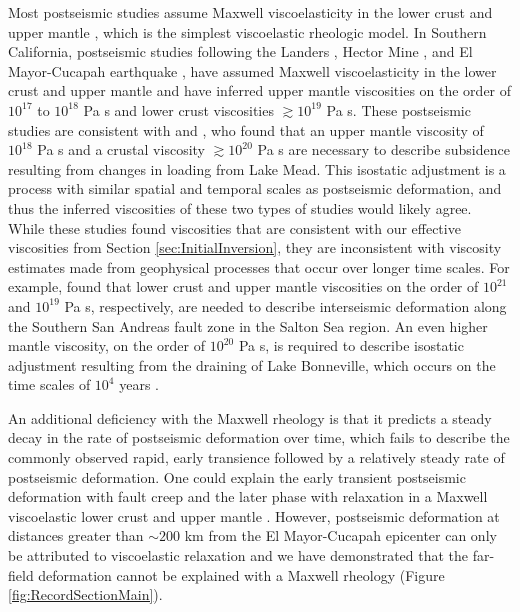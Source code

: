 \documentclass[draft,linenumbers]{AGUJournal}
\begin{document}
Most postseismic studies assume Maxwell viscoelasticity in the lower crust and upper mantle \citep[e.g.][]{Nur1974,Pollitz2000,Hetland2003,Freed2006a,Johnson2009,Hearn2009}, which is the simplest viscoelastic rheologic model.  In Southern California, postseismic studies following the Landers \citep{Pollitz2000}, Hector Mine \citep{Pollitz2001}, and El Mayor-Cucapah earthquake \citep{Spinler2015,Rollins2015}, have assumed Maxwell viscoelasticity in the lower crust and upper mantle and have inferred upper mantle viscosities on the order of $10^{17}$ to $10^{18}$ Pa s and lower crust viscosities $\gtrsim 10^{19}$ Pa s.  These postseismic studies are consistent with \citet{Kaufmann2000} and \citet{Cavalie2007}, who found that an upper mantle viscosity of $10^{18}$ Pa s and a crustal viscosity $\gtrsim10^{20}$ Pa s are necessary to describe subsidence resulting from changes in loading from Lake Mead. This isostatic adjustment is a process with similar spatial and temporal scales as postseismic deformation, and thus the inferred viscosities of these two types of studies would likely agree. While these studies found viscosities that are consistent with our effective viscosities from Section \ref{sec:InitialInversion}, they are inconsistent with viscosity estimates made from geophysical processes that occur over longer time scales. For example, \citet{Lundgren2009} found that lower crust and upper mantle viscosities on the order of $10^{21}$ and $10^{19}$ Pa s, respectively, are needed to describe interseismic deformation along the Southern San Andreas fault zone in the Salton Sea region.  An even higher mantle viscosity, on the order of $10^{20}$ Pa s, is required to describe isostatic adjustment resulting from the draining of Lake Bonneville, which occurs on the time scales of $10^{4}$ years \citep{Crittenden1967,Bills1987}.  

An additional deficiency with the Maxwell rheology is that it predicts a steady decay in the rate of postseismic deformation over time, which fails to describe the commonly observed rapid, early transience followed by a relatively steady rate of postseismic deformation.  One could explain the early transient postseismic deformation with fault creep and the later phase with relaxation in a Maxwell viscoelastic lower crust and upper mantle \citep[e.g][]{Hearn2009,Johnson2009}. However, postseismic deformation at distances greater than ${\sim}200$ km from the El Mayor-Cucapah epicenter can only be attributed to viscoelastic relaxation \citep{Freed2007a} and we have demonstrated that the far-field deformation cannot be explained with a Maxwell rheology (Figure \ref{fig:RecordSectionMain}).
\end{document}
